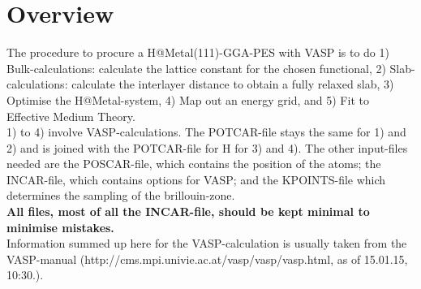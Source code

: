 \documentclass[twoside, 11pt, titlepage, captions=nooneline, a4paper, headsepline]{scrbook}%
\newcommand{\9}{\mathrm}
\newcommand{\0}{\,\mathrm}
\begin{document}
\section*{Overview}
The procedure to procure a H@Metal(111)-GGA-PES with VASP is to do 1) Bulk-calculations: calculate the lattice constant for the chosen functional, 2) Slab-calculations: calculate the interlayer distance to obtain a fully relaxed slab, 3) Optimise the H@Metal-system, 4) Map out an energy grid, and 5) Fit to Effective Medium Theory.\\
1) to 4) involve VASP-calculations. The POTCAR-file stays the same for 1) and 2) and is joined with the POTCAR-file for H for 3) and 4). The other input-files needed are the POSCAR-file, which contains the position of the atoms; the INCAR-file, which contains options for VASP; and the KPOINTS-file which determines the sampling of the brillouin-zone.\\
\textbf{All files, most of all the INCAR-file, should be kept minimal to minimise mistakes.}\\
Information summed up here for the VASP-calculation is usually taken from the VASP-manual (http://cms.mpi.univie.ac.at/vasp/vasp/vasp.html, as of 15.01.15, 10:30.).
\end{document}
